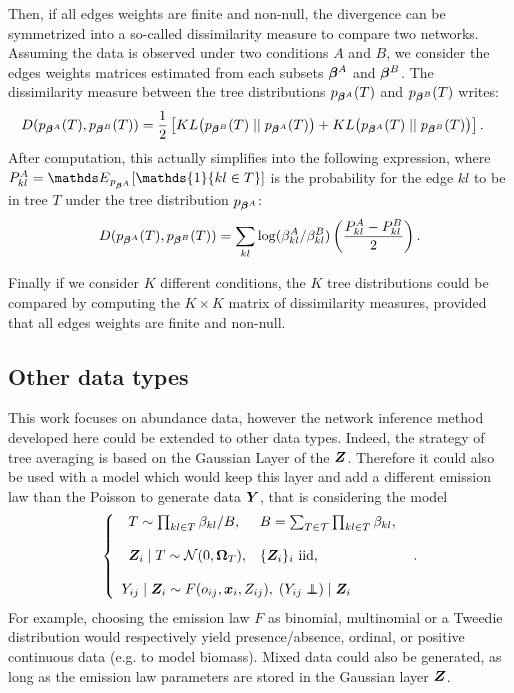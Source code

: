 Then, if all edges weights are finite and non-null, the divergence can be symmetrized into a so-called dissimilarity measure to compare two networks. Assuming the data is observed under two conditions $A$ and $B$, we consider the edges weights matrices estimated from each subsets ${\boldsymbol{\beta}}^A$ and ${\boldsymbol{\beta}}^B$. The dissimilarity measure between the tree distributions  $p_{{\boldsymbol{\beta}}^A}(T)$ and $p_{{\boldsymbol{\beta}}^B}(T)$ writes:
\begin{align*}
D(p_{{\boldsymbol{\beta}}^A}(T), p_{{\boldsymbol{\beta}}^B}(T)) &=\frac{1}{2} \left[KL\big( p_{{\boldsymbol{\beta}}^B} (T) \mid\mid p_{{\boldsymbol{\beta}}^A}(T)\big)+KL\big( p_{{\boldsymbol{\beta}}^A}(T)\mid\mid p_{{\boldsymbol{\beta}}^B} (T)  \big)\right].
\end{align*}
After computation, this actually simplifies into the following expression, where $P_{kl}^A = \Esp_{p_{\betabf^A}}[\mathds{1}\{kl\in T\}]$ is the probability for the edge $kl$ to be in tree $T$ under the tree distribution $p_{{\boldsymbol{\beta}}^A}$:
$$D(p_{{\boldsymbol{\beta}}^A}(T), p_{{\boldsymbol{\beta}}^B}(T)) = \sum_{kl} \log (\beta_{kl}^A /\beta_{kl}^B) \left( \frac{P_{kl}^A - P_{kl}^B}{2}\right).$$

Finally if we consider $K$ different conditions,  the $K$ tree distributions could be compared by computing the $K\times K$ matrix of dissimilarity measures, provided that all edges weights are finite and non-null.

\subsection{Other data types}
This work focuses on abundance data, however the network inference method developed here could be extended to other data types. Indeed, the strategy of tree averaging is based on the Gaussian Layer of the ${\boldsymbol{Z}}$. Therefore it could also be used with a model which would keep this layer and add a different emission law than the Poisson to generate data ${\boldsymbol{Y}}$, that is considering the model 
  \begin{equation*}
 \left\{ \begin{array}{l}
 \begin{array}{ll}
 T\sim \prod_{kl\in T} \beta_{kl} / B, &B= \sum_{T\in\mathcal{T}} \prod_{kl \in T} \beta_{kl},\\\\
 \Zbf_i\mid T  \sim \Ncal (0, \Omegab_T), &\{\Zbf_i\}_i \text{ iid, }\\
 \end{array} \\\\
 Y_{ij}\mid \Zbf_i\sim F (o_{ij},\xb_i,Z_{ij}), \; (Y_{ij} \independent) \mid \Zbf_i 
 \end{array} \right. .
 \end{equation*}
For example, choosing the emission law $F$ as  binomial, multinomial or a Tweedie distribution \citep{T84} would respectively yield presence/absence, ordinal, or positive continuous data (e.g. to model biomass). Mixed data could also be generated, as long as the emission law parameters are stored in the Gaussian layer ${\boldsymbol{Z}}$. 

